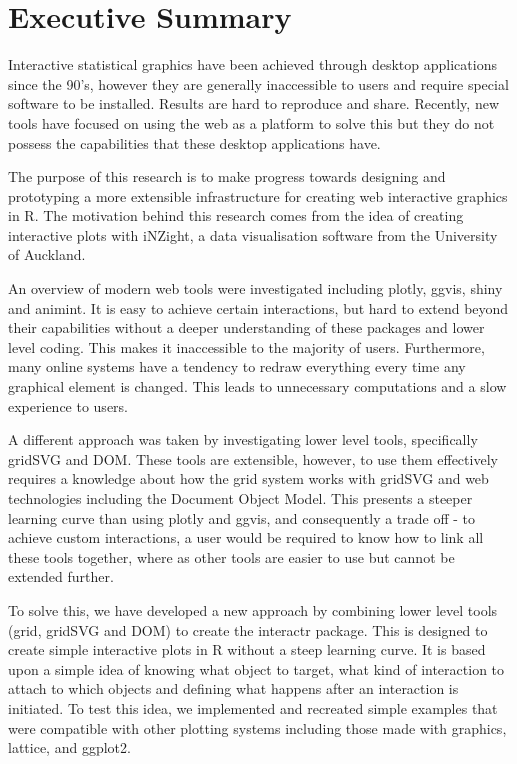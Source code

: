 \documentclass[11pt,]{report}
\begin{document}
\newpage

\chapter*{Executive Summary}\label{executive-summary}

Interactive statistical graphics have been achieved through desktop
applications since the 90's, however they are generally inaccessible to
users and require special software to be installed. Results are hard to
reproduce and share. Recently, new tools have focused on using the web
as a platform to solve this but they do not possess the capabilities
that these desktop applications have.

The purpose of this research is to make progress towards designing and
prototyping a more extensible infrastructure for creating web
interactive graphics in R. The motivation behind this research comes
from the idea of creating interactive plots with \textsf{iNZight}, a
data visualisation software from the University of Auckland.

An overview of modern web tools were investigated including
\textsf{plotly}, \textsf{ggvis}, \textsf{shiny} and \textsf{animint}. It
is easy to achieve certain interactions, but hard to extend beyond their
capabilities without a deeper understanding of these packages and lower
level coding. This makes it inaccessible to the majority of users.
Furthermore, many online systems have a tendency to redraw everything
every time any graphical element is changed. This leads to unnecessary
computations and a slow experience to users.

A different approach was taken by investigating lower level tools,
specifically \textsf{gridSVG} and \textsf{DOM}. These tools are
extensible, however, to use them effectively requires a knowledge about
how the grid system works with gridSVG and web technologies including
the Document Object Model. This presents a steeper learning curve than
using plotly and ggvis, and consequently a trade off - to achieve custom
interactions, a user would be required to know how to link all these
tools together, where as other tools are easier to use but cannot be
extended further.

To solve this, we have developed a new approach by combining lower level
tools (\textsf{grid}, \textsf{gridSVG} and \textsf{DOM}) to create the
\textsf{interactr} package. This is designed to create simple
interactive plots in R without a steep learning curve. It is based upon
a simple idea of knowing what object to target, what kind of interaction
to attach to which objects and defining what happens after an
interaction is initiated. To test this idea, we implemented and
recreated simple examples that were compatible with other plotting
systems including those made with \textsf{graphics}, \textsf{lattice},
and \textsf{ggplot2}.
\end{document}
